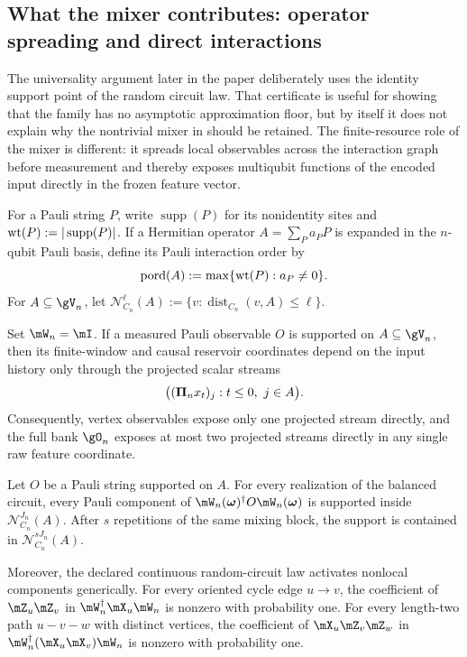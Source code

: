 \subsection{What the mixer contributes: operator spreading and direct interactions}
\label{sec:mixer-expressivity}

The universality argument later in the paper deliberately uses the identity
support point of the random circuit law.  That certificate is useful for
showing that the family has no asymptotic approximation floor, but by itself it
does not explain why the nontrivial mixer in 
should be retained.  The finite-resource role of the mixer is different: it
spreads local observables across the interaction graph before measurement and
thereby exposes multiqubit functions of the encoded input directly in the
frozen feature vector.

For a Pauli string $P$, write $\operatorname{supp}(P)$ for its nonidentity
sites and $\operatorname{wt}(P):=|\operatorname{supp}(P)|$.  If a Hermitian operator
$A=\sum_P a_PP$ is expanded in the $n$-qubit Pauli basis, define its Pauli
interaction order by
\begin{equation}
    \operatorname{pord}(A):=\max\{\operatorname{wt}(P):a_P\neq0\}.
    \label{eq:pauli-interaction-order}
\end{equation}
For $A\subseteq\gV_n$, let
$\mathcal N_{C_n}^{\ell}(A):=\{v:\operatorname{dist}_{C_n}(v,A)\leq\ell\}$.

\begin{proposition}
\label{prop:identity-mixer-locality}
Set $\reservoirUnitary_n=\identity$.  If a measured Pauli observable $O$ is
supported on $A\subseteq\gV_n$, then its finite-window and causal reservoir
coordinates depend on the input history only through the projected scalar
streams
\[
    \bigl((\bm{\Pi}_nx_t)_j:t\leq0,\ j\in A\bigr).
\]
Consequently, vertex observables expose only one projected stream directly,
and the full bank $\gO_n$ exposes at most two projected streams directly in any
single raw feature coordinate.
\end{proposition}

\begin{theorem}
\label{thm:graph-local-operator-spreading}
Let $O$ be a Pauli string supported on $A$.  For every realization of the
balanced circuit, every Pauli component of
$\reservoirUnitary_n(\rpar)^\dagger O\reservoirUnitary_n(\rpar)$ is supported
inside $\mathcal N_{C_n}^{J_n}(A)$.  After $s$ repetitions of the same mixing
block, the support is contained in $\mathcal N_{C_n}^{sJ_n}(A)$.

Moreover, the declared continuous random-circuit law activates nonlocal
components generically.  For every oriented cycle edge $u\to v$, the
coefficient of $\pauliZ_u\pauliZ_v$ in
$\reservoirUnitary_n^\dagger\pauliX_u\reservoirUnitary_n$ is nonzero with
probability one.  For every length-two path $u-v-w$ with distinct vertices,
the coefficient of $\pauliX_u\pauliZ_v\pauliZ_w$ in
$\reservoirUnitary_n^\dagger(\pauliX_u\pauliX_v)\reservoirUnitary_n$ is
nonzero with probability one.
\end{theorem}

